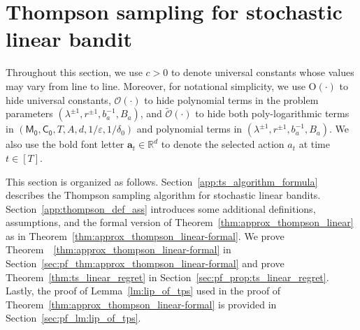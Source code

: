 \documentclass[10pt]{article}
\newcommand{\eps}{\varepsilon}
\renewcommand{\cO}{\mathcal{O}}
\newcommand{\<}{\left\langle}
\renewcommand{\>}{\right\rangle}
\newcommand{\R}{\mathbb{R}}
\newcommand{\Tpsparn}{{r}}
\newcommand{\tcO}{{\tilde{\mathcal O}}}
\newcommand{\action}{{a}}
\newcommand{\totlen}{{T}}
\newcommand{\conO}{{\mathrm{O}}}
\newcommand{\neuron}{{\mathsf{M_0}}}
\newcommand{\weightn}{{{\mathsf{C_0}}}}
\def\ba{{\mathbf a}}
\begin{document}
    










\section{Thompson sampling for stochastic linear bandit}\label{example:ts-app}

Throughout this section, we use $c>0$ to denote universal constants whose values may vary from line to line.
Moreover, for notational simplicity, we use $\conO(\cdot)$ to hide universal constants, $\cO(\cdot)$ to hide polynomial terms in the problem parameters  $(\lambda^{\pm1},\Tpsparn^{\pm1},b_a^{-1},B_a)$, and $\tcO(\cdot)$ to hide both poly-logarithmic terms in $(\neuron,\weightn,T,A,d,1/\eps,1/\delta_0)$ and polynomial terms in $(\lambda^{\pm1},\Tpsparn^{\pm1},b_a^{-1},B_a)$. We also use the bold font letter $\ba_t\in\R^d$ to denote the selected action $\action_t$ at time $t\in[\totlen]$.



This section is organized as follows. Section~\ref{app:ts_algorithm_formula} describes the Thompson sampling algorithm for stochastic linear bandits. Section~\ref{app:thompson_def_ass} introduces some additional definitions, assumptions, and the formal version of Theorem~\ref{thm:approx_thompson_linear} as in Theorem~\ref{thm:approx_thompson_linear-formal}.
We prove Theorem~~\ref{thm:approx_thompson_linear-formal} in Section~\ref{sec:pf_thm:approx_thompson_linear-formal} and prove Theorem~\ref{thm:ts_linear_regret} in Section~\ref{sec:pf_prop:ts_linear_regret}. Lastly, the proof of Lemma~\ref{lm:lip_of_tps} used in the proof of Theorem~\ref{thm:approx_thompson_linear-formal} is provided in Section~\ref{sec:pf_lm:lip_of_tps}.
\end{document}
